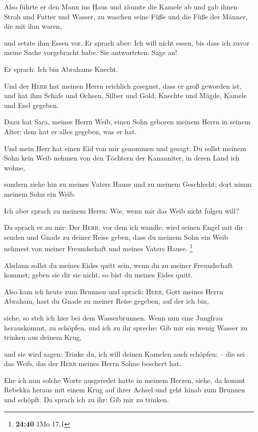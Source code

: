  Also führte er den Mann ins Haus und zäumte die Kamele
ab und gab ihnen Stroh und Futter und Wasser, zu waschen seine Füße und
die Füße der Männer, die mit ihm waren,

 und setzte ihm Essen vor. Er sprach aber: Ich will nicht
essen, bis dass ich zuvor meine Sache vorgebracht habe. Sie antworteten:
Sage an!

 Er sprach: Ich bin Abrahams Knecht.

 Und der \textsc{Herr} hat meinen Herrn reichlich
gesegnet, dass er groß geworden ist, und hat ihm Schafe und Ochsen,
Silber und Gold, Knechte und Mägde, Kamele und Esel gegeben.

 Dazu hat Sara, meines Herrn Weib, einen Sohn geboren
meinem Herrn in seinem Alter; dem hat er alles gegeben, was er hat.

 Und mein Herr hat einen Eid von mir genommen und gesagt:
Du sollst meinem Sohn kein Weib nehmen von den Töchtern der Kanaaniter,
in deren Land ich wohne,

 sondern ziehe hin zu meines Vaters Hause und zu meinem
Geschlecht; dort nimm meinem Sohn ein Weib.

 Ich aber sprach zu meinem Herrn: Wie, wenn mir das Weib
nicht folgen will?

 Da sprach er zu mir: Der \textsc{Herr}, vor dem ich
wandle, wird seinen Engel mit dir senden und Gnade zu deiner Reise
geben, dass du meinem Sohn ein Weib nehmest von meiner Freundschaft und
meines Vaters Hause. \footnote{\textbf{24:40} 1Mo 17,1}

 Alsdann sollst du meines Eides quitt sein, wenn du zu
meiner Freundschaft kommst; geben sie dir sie nicht, so bist du meines
Eides quitt.

 Also kam ich heute zum Brunnen und sprach:
\textsc{Herr}, Gott meines Herrn Abraham, hast du Gnade zu meiner Reise
gegeben, auf der ich bin,

 siehe, so steh ich hier bei dem Wasserbrunnen. Wenn nun
eine Jungfrau herauskommt, zu schöpfen, und ich zu ihr spreche: Gib mir
ein wenig Wasser zu trinken aus deinem Krug,

 und sie wird sagen: Trinke du, ich will deinen Kamelen
auch schöpfen: -- die sei das Weib, das der \textsc{Herr} meines Herrn
Sohne beschert hat.

 Ehe ich nun solche Worte ausgeredet hatte in meinem
Herzen, siehe, da kommt Rebekka heraus mit einem Krug auf ihrer Achsel
und geht hinab zum Brunnen und schöpft. Da sprach ich zu ihr: Gib mir zu
trinken.

